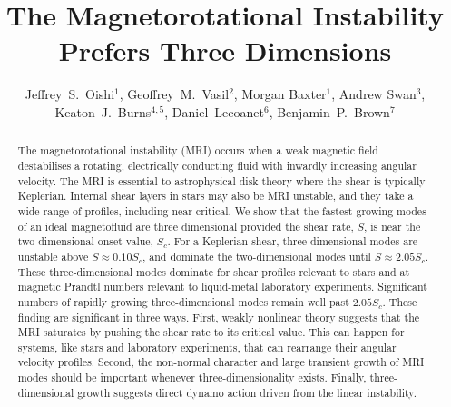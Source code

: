 \documentclass[openacc]{rsproca_new}%
\begin{document}
\title{The Magnetorotational Instability Prefers Three Dimensions}

\author{%
Jeffrey~S.~Oishi$^{1}$, Geoffrey~M.~Vasil$^{2}$, Morgan Baxter$^{1}$,
Andrew Swan$^{3}$, Keaton~J.~Burns$^{4,5}$, Daniel~Lecoanet$^6$, Benjamin~P.~Brown$^7$}

\address{$^{1}$Bates College Department of Physics and Astronomy, Lewiston, ME 04240, USA\\
$^{2}$University of Sydney School of Mathematics and Statistics, Sydney, NSW, Australia\\
$^{3}$Statistical Laboratory, DPMMS, University of Cambridge, Cambridge,
UK\\
$^{4}5$Center for Computational Astrophysics, Flatiron Institute, New York, NY 10010, USA\\
$^{5}$Massachusetts Institute of Technology Department of Physics, Cambridge, MA 02139, USA\\
$^{6}$Princeton University Department of Astrophysical Sciences, Princeton, NJ 08544, USA\\
$^{7}$University of Colorado Laboratory for Atmospheric and Space Physics and Department of Astrophysical and Planetary Sciences, Boulder, CO 80309, USA}

\begin{abstract}
The magnetorotational instability (MRI) occurs when a weak magnetic field destabilises a rotating, electrically conducting fluid with inwardly increasing angular velocity.
The MRI is essential to astrophysical disk theory where the shear is typically Keplerian.
Internal shear layers in stars may also be MRI unstable, and they take a wide range of profiles, including near-critical.
We show that the fastest growing modes of an ideal magnetofluid are three dimensional provided the shear rate, $S$, is near the two-dimensional onset value, $S_c$.
For a Keplerian shear, three-dimensional modes are unstable above $S\approx0.10S_c$, and dominate the two-dimensional modes until $S\approx2.05S_{c}$.
These three-dimensional modes dominate for shear profiles relevant to stars and at magnetic Prandtl numbers relevant to liquid-metal laboratory experiments.
Significant numbers of rapidly growing three-dimensional modes remain well past $2.05S_{c}$. 
These finding are significant in three ways. 
First, weakly nonlinear theory suggests that the MRI saturates by pushing the shear rate to its critical value. 
This can happen for systems, like stars and laboratory experiments, that can rearrange their angular velocity profiles.
Second, the non-normal character and large transient growth of MRI modes should be important whenever three-dimensionality exists.
Finally, three-dimensional growth suggests direct dynamo action driven from the linear instability.
\end{abstract}
\end{document}
